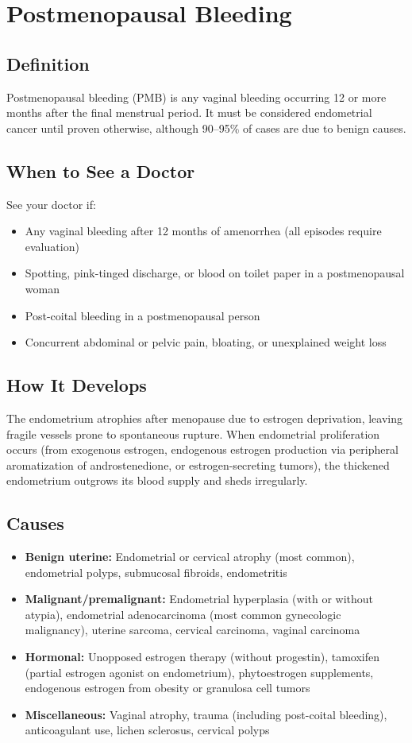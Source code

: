 \chapter{Postmenopausal Bleeding}

\section*{Definition}
Postmenopausal bleeding (PMB) is any vaginal bleeding occurring 12 or more months after the final menstrual period. It must be considered endometrial cancer until proven otherwise, although 90--95\% of cases are due to benign causes.

\section*{When to See a Doctor}
See your doctor if:
\begin{itemize}
  \item Any vaginal bleeding after 12 months of amenorrhea (all episodes require evaluation)
  \item Spotting, pink-tinged discharge, or blood on toilet paper in a postmenopausal woman
  \item Post-coital bleeding in a postmenopausal person
  \item Concurrent abdominal or pelvic pain, bloating, or unexplained weight loss
\end{itemize}

\section*{How It Develops}
The endometrium atrophies after menopause due to estrogen deprivation, leaving fragile vessels prone to spontaneous rupture. When endometrial proliferation occurs (from exogenous estrogen, endogenous estrogen production via peripheral aromatization of androstenedione, or estrogen-secreting tumors), the thickened endometrium outgrows its blood supply and sheds irregularly.

\section*{Causes}
\begin{itemize}
  \item \textbf{Benign uterine:} Endometrial or cervical atrophy (most common), endometrial polyps, submucosal fibroids, endometritis
  \item \textbf{Malignant/premalignant:} Endometrial hyperplasia (with or without atypia), endometrial adenocarcinoma (most common gynecologic malignancy), uterine sarcoma, cervical carcinoma, vaginal carcinoma
  \item \textbf{Hormonal:} Unopposed estrogen therapy (without progestin), tamoxifen (partial estrogen agonist on endometrium), phytoestrogen supplements, endogenous estrogen from obesity or granulosa cell tumors
  \item \textbf{Miscellaneous:} Vaginal atrophy, trauma (including post-coital bleeding), anticoagulant use, lichen sclerosus, cervical polyps
\end{itemize}


